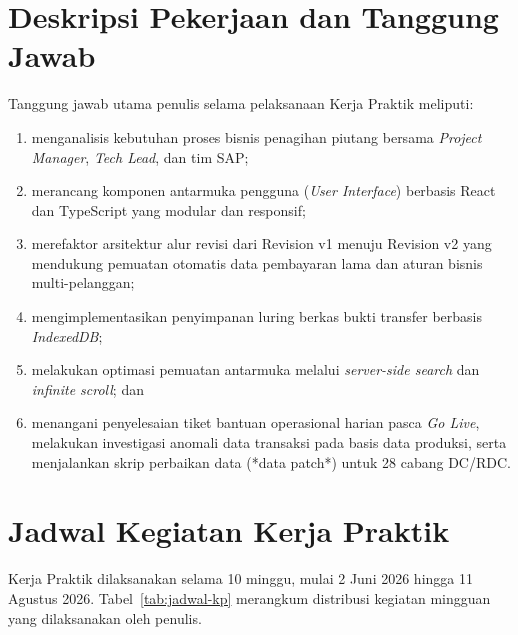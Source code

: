 \section{Deskripsi Pekerjaan dan Tanggung Jawab}
Tanggung jawab utama penulis selama pelaksanaan Kerja Praktik meliputi:
\begin{enumerate}[label=\arabic*)]
  \item menganalisis kebutuhan proses bisnis penagihan piutang bersama \textit{Project Manager}, \textit{Tech Lead}, dan tim SAP;
  \item merancang komponen antarmuka pengguna (\textit{User Interface}) berbasis React dan TypeScript yang modular dan responsif;
  \item merefaktor arsitektur alur revisi dari Revision v1 menuju Revision v2 yang mendukung pemuatan otomatis data pembayaran lama dan aturan bisnis multi-pelanggan;
  \item mengimplementasikan penyimpanan luring berkas bukti transfer berbasis \textit{IndexedDB};
  \item melakukan optimasi pemuatan antarmuka melalui \textit{server-side search} dan \textit{infinite scroll}; dan
  \item menangani penyelesaian tiket bantuan operasional harian pasca \textit{Go Live}, melakukan investigasi anomali data transaksi pada basis data produksi, serta menjalankan skrip perbaikan data (*data patch*) untuk 28 cabang DC/RDC.
\end{enumerate}

\section{Jadwal Kegiatan Kerja Praktik}
Kerja Praktik dilaksanakan selama 10 minggu, mulai 2 Juni 2026 hingga 11 Agustus 2026. Tabel~\ref{tab:jadwal-kp} merangkum distribusi kegiatan mingguan yang dilaksanakan oleh penulis.

